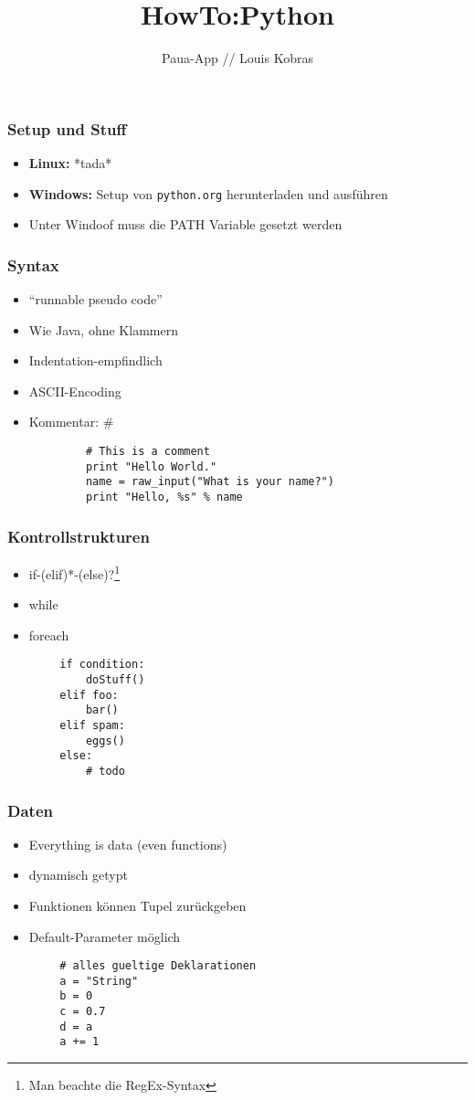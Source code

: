 \documentclass{beamer}
\title{HowTo:Python}
\author{Paua-App // Louis Kobras}
\begin{document}
\begin{frame}
	\maketitle
\end{frame}
\begin{frame}[fragile]
	\frametitle{Setup und Stuff}
	\begin{itemize}
		\item \textbf{Linux:} *tada*
		\item \textbf{Windows:} Setup von \texttt{python.org} herunterladen und ausführen
		\item Unter Windoof muss die PATH Variable gesetzt werden
	\end{itemize}
\end{frame}
\begin{frame}[fragile]
	\frametitle{Syntax}
	\begin{itemize}
		\item ``runnable pseudo code''
		\item Wie Java, ohne Klammern
		\item Indentation-empfindlich
		\item ASCII-Encoding
		\item Kommentar: \#
	\end{itemize}
	\pause
		\begin{lstlisting}
			# This is a comment
			print "Hello World."
			name = raw_input("What is your name?")
			print "Hello, %s" % name
		\end{lstlisting}
\end{frame}


\begin{frame}[fragile]
	\frametitle{Kontrollstrukturen}
	\begin{itemize}
		\item if-(elif)*-(else)?\footnote{Man beachte die RegEx-Syntax}
		\item while
		\item foreach
	\end{itemize}
	\pause
	\begin{lstlisting}
		if condition:
    		doStuff()
		elif foo:
		    bar()
		elif spam:
		    eggs()
		else:
		    # todo
	\end{lstlisting}
\end{frame}

\begin{frame}[fragile]
	\frametitle{Daten}
	\begin{itemize}
		\item Everything is data (even functions)
		\item dynamisch getypt
		\item Funktionen können Tupel zurückgeben
		\item Default-Parameter möglich
	\end{itemize}
	\pause
	\begin{lstlisting}
		# alles gueltige Deklarationen
		a = "String"
		b = 0
		c = 0.7
		d = a
		a += 1
	\end{lstlisting}
\end{frame}
\end{document}

